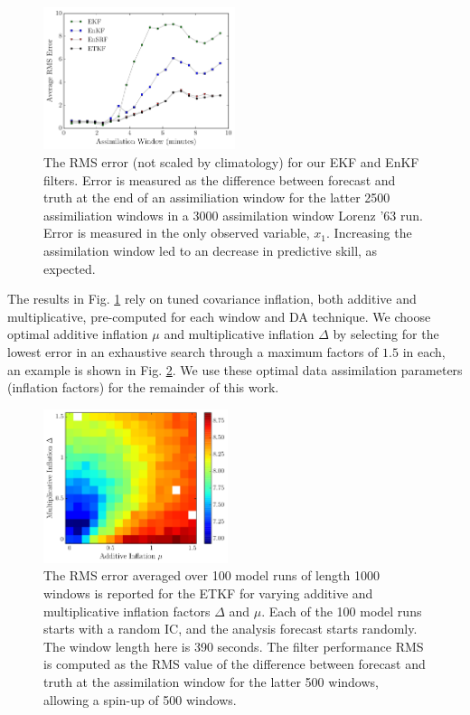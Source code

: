 \documentclass[pre,twocolumn,twoside,byrevtex,superscriptaddress]{revtex4}
\begin{document}
\begin{figure}[h]
  \centering
  \includegraphics[width=0.50\textwidth]{fig06_2015-09-30-14-17-window-experiment.pdf}
  \caption[The RMS error is reported for our EKF and EnKF filters]{
    The RMS error (not scaled by climatology) for our EKF and EnKF filters.
    Error is measured as the difference between forecast and truth at the end of an assimiliation window for the latter 2500 assimiliation windows in a 3000 assimilation window Lorenz '63 run.
    Error is measured in the only observed variable, $x_1$.
    Increasing the assimilation window led to an decrease in predictive skill, as expected.
  }
  \label{fig:window_test}
\end{figure}

The results in Fig. \ref{fig:window_test} rely on tuned covariance inflation, both additive and multiplicative, pre-computed for each window and DA technique.
We choose optimal additive inflation $\mu$ and multiplicative inflation $\Delta$ by selecting for the lowest error in an exhaustive search through a maximum factors of $1.5$ in each, an example is shown in Fig. \ref{fig:ETKF_cov_tuning_390s}.
We use these optimal data assimilation parameters (inflation factors) for the remainder of this work.

\begin{figure}[h]
  \centering
  \includegraphics[width=0.48\textwidth]{fig07_2015-09-30-15-35-ETKF-390s.pdf}
  \caption[The RMS error averaged over 100 model runs of length 1000 windows is reported for the ETKF for varying additive and multiplicative inflation factors]{
    The RMS error averaged over 100 model runs of length 1000 windows is reported for the ETKF for varying additive and multiplicative inflation factors $\Delta$ and $\mu$.
    Each of the 100 model runs starts with a random IC, and the analysis forecast starts randomly.
    The window length here is 390 seconds.
    The filter performance RMS is computed as the RMS value of the difference between forecast and truth at the assimilation window for the latter 500 windows, allowing a spin-up of 500 windows.
  }
  \label{fig:ETKF_cov_tuning_390s}
\end{figure}
\end{document}
